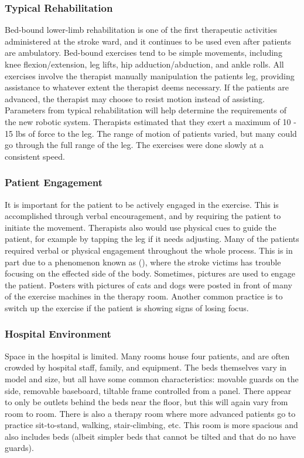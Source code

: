 \documentclass[12pt]{article}
\begin{document}
	\subsubsection{Typical Rehabilitation}
	
	Bed-bound lower-limb rehabilitation is one of the first therapeutic activities administered at the stroke ward, and it continues to be used even after patients are ambulatory. Bed-bound exercises tend to be simple movements, including knee flexion/extension, leg lifts, hip adduction/abduction, and ankle rolls. All exercises involve the therapist manually manipulation the patients leg, providing assistance to whatever extent the therapist deems necessary. If the patients are advanced, the therapist may choose to resist motion instead of assisting. 
	Parameters from typical rehabilitation will help determine the requirements of the new robotic system. Therapists estimated that they exert a maximum of 10 - 15 lbs of force to the leg. The range of motion of patients varied, but many could go through the full range of the leg. The exercises were done slowly at a consistent speed. 
	
	\subsubsection{Patient Engagement} 
	 It is important for the patient to be actively engaged in the exercise. This is accomplished through verbal encouragement, and by requiring the patient to initiate the movement. Therapists also would use physical cues to guide the patient, for example by tapping the leg if it needs adjusting. Many of the patients required verbal or physical engagement throughout the whole process. This is in part due to a phenomenon known as (), where the stroke victims has trouble focusing on the effected side of the body. Sometimes, pictures are used to engage the patient. Posters with pictures of cats and dogs were posted in front of many of the exercise machines in the therapy room. Another common practice is to switch up the exercise if the patient is showing signs of losing focus. 
	 
	 \subsubsection{Hospital Environment}
	Space in the hospital is limited. Many rooms house four patients, and are often crowded by hospital staff, family, and equipment. The beds themselves vary in model and size, but all have some common characteristics: movable guards on the side, removable baseboard, tiltable frame controlled from a panel. There appear to only be outlets behind the beds near the floor, but this will again vary from room to room. 
	There is also a therapy room where more advanced patients go to practice sit-to-stand, walking, stair-climbing, etc. This room is more spacious and also includes beds (albeit simpler beds that cannot be tilted and that do no have guards). 
	 
\end{document}
